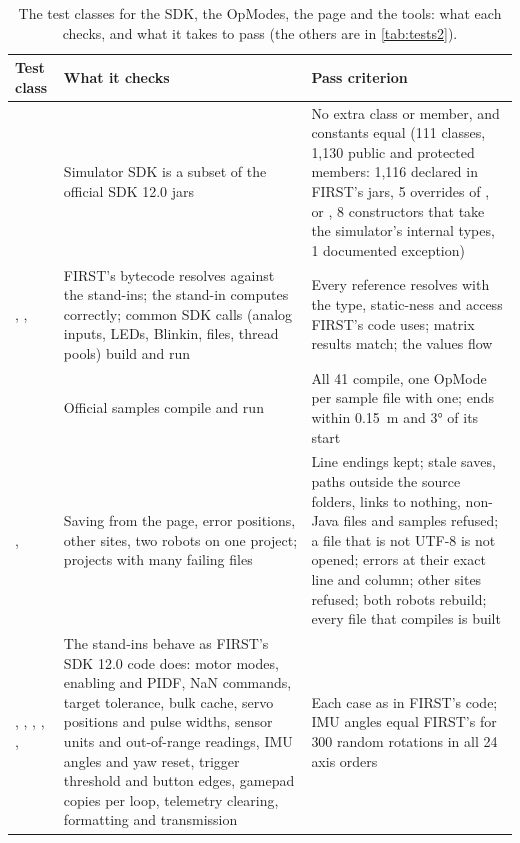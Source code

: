 \documentclass[10pt,twocolumn,letterpaper]{article}
\begin{document}
\begin{table}[tp]
\centering
\footnotesize
\caption{The test classes for the SDK, the OpModes, the page and the tools: what each checks, and what it takes to pass (the others are in \cref{tab:tests2}).}\label{tab:tests}
\begin{tabularx}{\textwidth}{@{}>{\raggedright\arraybackslash}p{4.0cm}>{\raggedright\arraybackslash}p{5.2cm}L@{}}
\toprule
\textbf{Test class} & \textbf{What it checks} & \textbf{Pass criterion} \\
\midrule
{} & Simulator SDK is a subset of the official SDK 12.0 jars & No extra class or member, and constants equal (111 classes, 1,130 public and protected members: 1,116 declared in FIRST's jars, 5 overrides of ,  or , 8 constructors that take the simulator's internal types, 1 documented exception) \\
, ,  & FIRST's bytecode resolves against the stand-ins; the  stand-in computes correctly; common SDK calls (analog inputs, LEDs, Blinkin, files, thread pools) build and run & Every reference resolves with the type, static-ness and access FIRST's code uses; matrix results match; the values flow \\
 & Official samples compile and run & All 41 compile, one OpMode per sample file with one;  ends within 0.15~m and 3° of its start \\
,  & Saving from the page, error positions, other sites, two robots on one project; projects with many failing files & Line endings kept; stale saves, paths outside the source folders, links to nothing, non-Java files and samples refused; a file that is not UTF-8 is not opened; errors at their exact line and column; other sites refused; both robots rebuild; every file that compiles is built \\
, , , , ,  & The stand-ins behave as FIRST's SDK 12.0 code does: motor modes, enabling and PIDF, NaN commands, target tolerance, bulk cache, servo positions and pulse widths, sensor units and out-of-range readings, IMU angles and yaw reset, trigger threshold and button edges, gamepad copies per loop, telemetry clearing, formatting and transmission & Each case as in FIRST's code; IMU angles equal FIRST's for 300 random rotations in all 24 axis orders \\

\end{tabularx}
\end{table}
\end{document}
